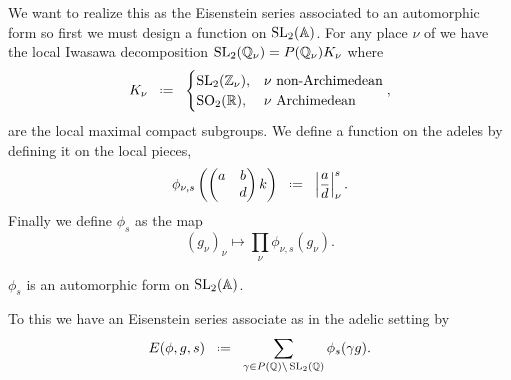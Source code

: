 We want to realize this as the Eisenstein series associated to an automorphic form so first we must design a function on \(\SL_2(\A)\). For any place \(\nu\) of \Q we have the local Iwasawa decomposition \(\SL_2(\Q_\nu) = P(\Q_\nu) K_\nu\) where 
\[K_\nu \defeq \begin{cases}
	\SL_2(\Z_\nu), & \nu \text{ non-Archimedean}\\
	\SO_2(\R), & \nu \text{ Archimedean}
\end{cases},\]
 are the local maximal compact subgroups. We define a function on the adeles by defining it on the local pieces,
 \[\phi_{\nu, s}\left(\begin{pmatrix}
 	a & b\\ & d
 \end{pmatrix}k\right) \defeq \left| \frac{a}{d} \right|_\nu^s .\]
 Finally we define \(\phi_s\) as the map 
 \[(g_\nu)_{\nu} \mapsto \prod_\nu \phi_{\nu,s}(g_\nu).\]
 
 \begin{Lemma}
 	\(\phi_s\) is an automorphic form on \(\SL_2(\A)\).
 \end{Lemma}
 
 To this we have an Eisenstein series associate as in the adelic setting by 
 \[E(\phi, g,s) \defeq \sum_{\gamma\in P(\Q)\backslash \SL_2(\Q)} \phi_s(\gamma g) .\]

